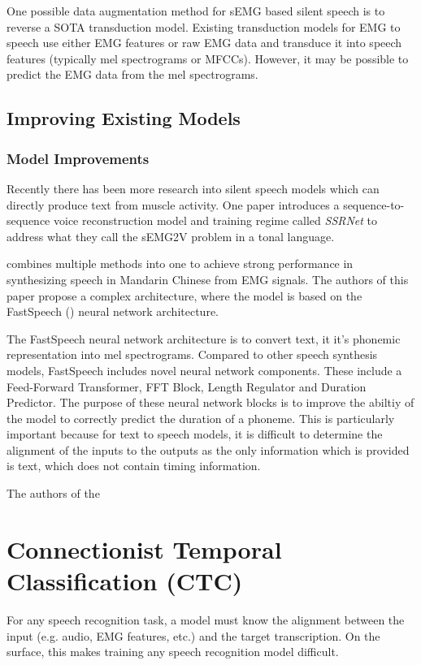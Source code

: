 One possible data augmentation method for sEMG based silent speech is to
reverse a SOTA transduction model. Existing transduction models for
EMG to speech use either EMG features or raw EMG data and transduce
it into speech features (typically mel spectrograms or MFCCs). However,
it may be possible to predict the EMG data from the mel spectrograms.

\subsection{Improving Existing Models}

\subsubsection{Model Improvements}

Recently there has been more research into silent speech models which
can directly produce text from muscle activity. One paper introduces
a sequence-to-sequence voice reconstruction model and training regime
called \textit{SSRNet} to address what they call the sEMG2V problem
in a tonal language.

combines
multiple methods into one to achieve strong performance in synthesizing
speech in Mandarin Chinese from EMG signals. The authors of this paper
propose a complex architecture, where the model is based on the
FastSpeech (\cite{fastspeech}) neural network architecture.

The FastSpeech
neural network architecture is to convert text, it it's phonemic
representation into mel spectrograms. Compared to other speech
synthesis models, FastSpeech includes novel neural network components.
These include a Feed-Forward Transformer, FFT Block, Length Regulator
and Duration Predictor. The purpose of these neural network blocks
is to improve the abiltiy of the model to correctly predict the duration
of a phoneme. This is particularly important because for text to speech
models, it is difficult to determine the alignment of the inputs to
the outputs as the only information which is provided is text, which
does not contain timing information.

The authors of the 


\section{Connectionist Temporal Classification (CTC)}

For any speech recognition task, a model must know the alignment
between the input (e.g. audio, EMG features, etc.) and the target
transcription. On the surface, this makes training any speech
recognition model difficult.

